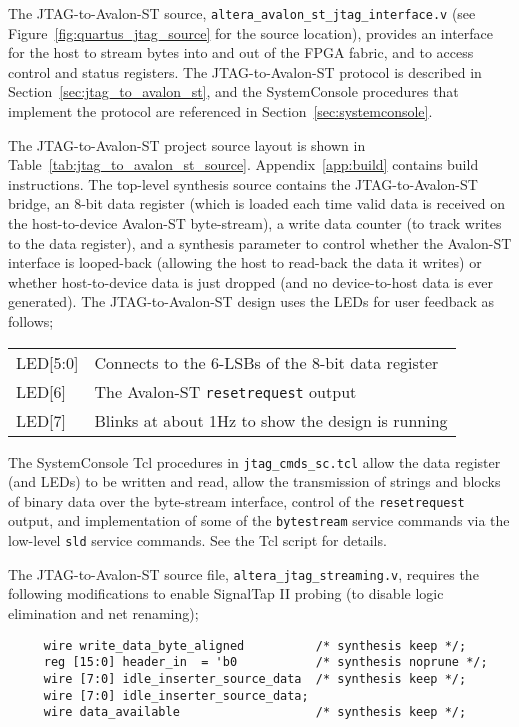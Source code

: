 \documentclass[10pt,twoside]{article}
\begin{document}
The JTAG-to-Avalon-ST source, \verb+altera_avalon_st_jtag_interface.v+ (see 
Figure~\ref{fig:quartus_jtag_source} for the source location),
provides an interface for the host to stream bytes into and out of
the FPGA fabric, and to access control and status registers.
The JTAG-to-Avalon-ST protocol is described in 
Section~\ref{sec:jtag_to_avalon_st}, and the SystemConsole procedures
that implement the protocol are referenced in 
Section~\ref{sec:systemconsole}.

The JTAG-to-Avalon-ST project source layout is shown in 
Table~\ref{tab:jtag_to_avalon_st_source}.
Appendix~\ref{app:build} contains build instructions.
The top-level synthesis source contains the JTAG-to-Avalon-ST bridge,
an 8-bit data register (which is loaded each time valid data is received
on the host-to-device Avalon-ST byte-stream), a write data counter
(to track writes to the data register), and
a synthesis parameter to control whether the Avalon-ST interface
is looped-back (allowing the host to read-back the data it writes)
or whether host-to-device data is just dropped (and no device-to-host
data is ever generated).
The JTAG-to-Avalon-ST design uses the LEDs for user feedback as follows;
%
\begin{center}
\begin{tabular}{ll}
LED[5:0] & Connects to the 6-LSBs of the 8-bit data register\\
LED[6]   & The Avalon-ST \verb+resetrequest+ output\\
LED[7]   & Blinks at about 1Hz to show the design is running\\
\end{tabular}
\end{center}
%
The SystemConsole Tcl procedures in \verb+jtag_cmds_sc.tcl+ allow
the data register (and LEDs) to be written and read, allow the
transmission of strings and blocks of binary data over the byte-stream
interface, control of the \verb+resetrequest+ output, and
implementation of some of the \verb+bytestream+ service commands
via the low-level \verb+sld+ service commands. See the Tcl
script for details.

The JTAG-to-Avalon-ST source file, \verb+altera_jtag_streaming.v+,
requires the following modifications to enable SignalTap II
probing (to disable logic elimination and net renaming);
%
\begin{verbatim}
     wire write_data_byte_aligned          /* synthesis keep */;
     reg [15:0] header_in  = 'b0           /* synthesis noprune */;
     wire [7:0] idle_inserter_source_data  /* synthesis keep */;
     wire [7:0] idle_inserter_source_data;
     wire data_available                   /* synthesis keep */;
\end{verbatim}
%
\end{document}
